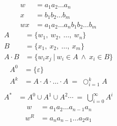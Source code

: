 	\begin{align*}
	w  &= a_1 a_2 \dots a_n\\
	x  &= b_1 b_2 \dots b_m\\
	wx &= a_1 a_2 \dots a_n b_1 b_2 \dots b_m
	\end{align*}
	\begin{align*} 
	A & = \{ w_1 ,\ w_2 ,\ \dots ,\ w_n \} \\ 
	B & = \{ x_1 ,\ x_2 ,\ \dots ,\ x_m \} \\ 
	A \cdot B & = \{ w_ix_j \ | \ w_i \in A \ \wedge \ x_i \in B \}
	\end{align*} 
	\begin{align*} 
	A^0 & = \{ \varepsilon \} \\
	A^k & = A \cdot A \cdot \ldots \cdot A \ = \ \bigcirc_{i=1}^{k} A \\
	\end{align*}
	\begin{align*} 
	A^* &= A^0 \cup A^1 \cup A^2 \cdots  \ = \ \bigcup_{i=0}^{ \infty } A^i
	\end{align*} 		
	\begin{align*}
	\ w\  &= a_1 a_2 \dots a_{n-1} a_n\\
	w^R  &= a_n a_{n-1} \dots a_2 a_1\\
	\end{align*}
